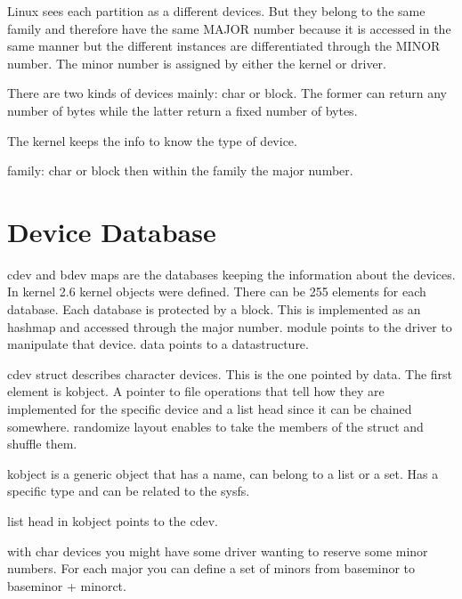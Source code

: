 \documentclass[twoside]{article}
\begin{document}
Linux sees each partition as a different devices. But they belong to the same
family and therefore have the same MAJOR number because it is accessed in the
same manner but the different instances are differentiated through the MINOR
number. The minor number is assigned by either the kernel or driver. 

There are two kinds of devices mainly: char or block. The former can return any
number of bytes while the latter return a fixed number of bytes.

The kernel keeps the info to know the type of device.

family: char or block then within the family the major number.

\section{Device Database}
\label{sec:Device Database}

cdev and bdev maps are the databases keeping the information about the devices.
In kernel 2.6 kernel objects were defined. There can be 255 elements for each
database. Each database is protected by a block. This is implemented as an
hashmap and accessed through the major number. module points to the driver to
manipulate that device. data points to a datastructure.

cdev struct describes character devices. This is the one pointed by data. The
first element is kobject. A pointer to file operations that tell how they are
implemented for the specific device and a list head since it can be chained
somewhere. randomize layout enables to take the members of the struct and
shuffle them.

kobject is a generic object that has a name, can belong to a list or a set. Has
a specific type and can be related to the sysfs.

list head in kobject points to the cdev.

with char devices you might have some driver wanting to reserve some minor
numbers. For each major you can define a set of minors from baseminor to
baseminor + minorct.

\newpage


\end{document}

